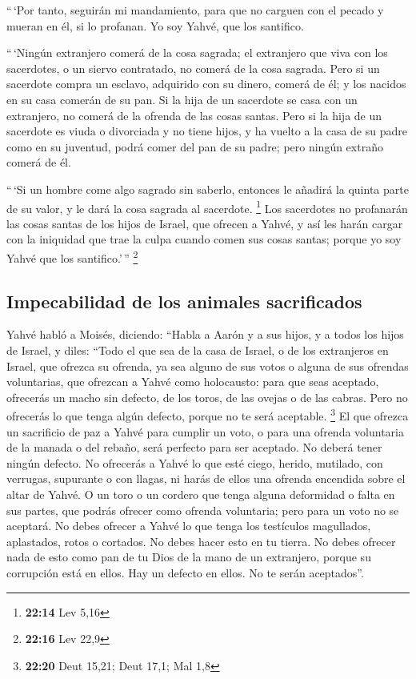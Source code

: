  ``\,`Por tanto, seguirán mi mandamiento, para que no
carguen con el pecado y mueran en él, si lo profanan. Yo soy Yahvé, que
los santifico.

 ``\,`Ningún extranjero comerá de la cosa sagrada; el
extranjero que viva con los sacerdotes, o un siervo contratado, no
comerá de la cosa sagrada.  Pero si un sacerdote compra
un esclavo, adquirido con su dinero, comerá de él; y los nacidos en su
casa comerán de su pan.  Si la hija de un sacerdote se
casa con un extranjero, no comerá de la ofrenda de las cosas santas.
 Pero si la hija de un sacerdote es viuda o divorciada y
no tiene hijos, y ha vuelto a la casa de su padre como en su juventud,
podrá comer del pan de su padre; pero ningún extraño comerá de él.

 ``\,`Si un hombre come algo sagrado sin saberlo,
entonces le añadirá la quinta parte de su valor, y le dará la cosa
sagrada al sacerdote. \footnote{\textbf{22:14} Lev 5,16} 
Los sacerdotes no profanarán las cosas santas de los hijos de Israel,
que ofrecen a Yahvé,  y así les harán cargar con la
iniquidad que trae la culpa cuando comen sus cosas santas; porque yo soy
Yahvé que los santifico.'\,'' \footnote{\textbf{22:16} Lev 22,9}

\hypertarget{impecabilidad-de-los-animales-sacrificados}{%
\subsection{Impecabilidad de los animales
sacrificados}\label{impecabilidad-de-los-animales-sacrificados}}

 Yahvé habló a Moisés, diciendo:  ``Habla
a Aarón y a sus hijos, y a todos los hijos de Israel, y diles: ``Todo el
que sea de la casa de Israel, o de los extranjeros en Israel, que
ofrezca su ofrenda, ya sea alguno de sus votos o alguna de sus ofrendas
voluntarias, que ofrezcan a Yahvé como holocausto:  para
que seas aceptado, ofrecerás un macho sin defecto, de los toros, de las
ovejas o de las cabras.  Pero no ofrecerás lo que tenga
algún defecto, porque no te será aceptable. \footnote{\textbf{22:20}
  Deut 15,21; Deut 17,1; Mal 1,8}  El que ofrezca un
sacrificio de paz a Yahvé para cumplir un voto, o para una ofrenda
voluntaria de la manada o del rebaño, será perfecto para ser aceptado.
No deberá tener ningún defecto.  No ofrecerás a Yahvé lo
que esté ciego, herido, mutilado, con verrugas, supurante o con llagas,
ni harás de ellos una ofrenda encendida sobre el altar de Yahvé.
 O un toro o un cordero que tenga alguna deformidad o
falta en sus partes, que podrás ofrecer como ofrenda voluntaria; pero
para un voto no se aceptará.  No debes ofrecer a Yahvé lo
que tenga los testículos magullados, aplastados, rotos o cortados. No
debes hacer esto en tu tierra.  No debes ofrecer nada de
esto como pan de tu Dios de la mano de un extranjero, porque su
corrupción está en ellos. Hay un defecto en ellos. No te serán
aceptados''.

